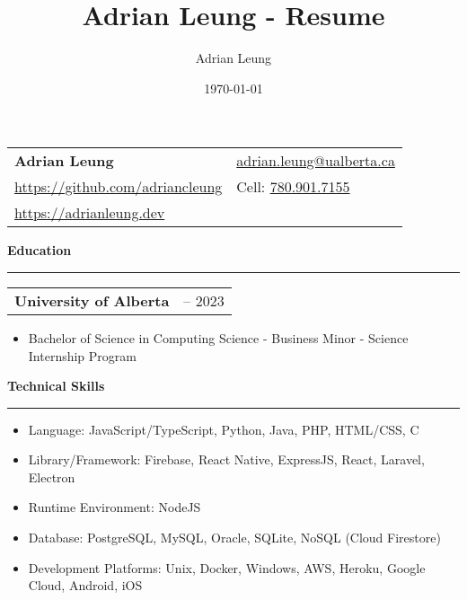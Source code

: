 \documentclass[11pt]{article}
\title{Adrian Leung - Resume}
\author{Adrian Leung}
\date{\today}
\newenvironment{compactList}
{
  \begin{itemize}
    \setlength{\itemsep}{0pt}
    \setlength{\parskip}{0pt}
}
{\end{itemize}}
\begin{document}
\begin{tabularx}{\textwidth}
  {
    >{\raggedright\arraybackslash}X
    >{\raggedleft\arraybackslash}X
  }
  \Large\textbf{Adrian Leung}                                             & \href{mailto:adrian.leung@ualberta.ca}{adrian.leung@ualberta.ca} \\
  \href{https://github.com/adriancleung}{https://github.com/adriancleung} & Cell: \href{tel:780.901.7155}{780.901.7155}                      \\
  \href{https://adrianleung.dev}{https://adrianleung.dev}                 &                                                                  \\
\end{tabularx}
\vspace{-15pt}

\begin{center}
  \textbf{Education}
  \noindent\rule[10pt]{0.9\paperwidth}{0.4pt}
\end{center}
\vspace{-20pt}
\begin{tabularx}{\textwidth}
  {
    >{\raggedright\arraybackslash}X
    >{\raggedleft\arraybackslash}X
  }
  \textbf{University of Alberta} & 2017 – 2023 \\
\end{tabularx}
\vspace{-20pt}
\begin{itemize}
  \item Bachelor of Science in Computing Science - Business Minor - Science Internship Program
\end{itemize}
\vspace{-15pt}

\begin{center}
  \textbf{Technical Skills}
  \noindent\rule[10pt]{0.9\paperwidth}{0.4pt}
\end{center}
\vspace{-30pt}
\begin{compactList}
  \item Language: JavaScript/TypeScript, Python, Java, PHP, HTML/CSS, C
  \item Library/Framework: Firebase, React Native, ExpressJS, React, Laravel, Electron
  \item Runtime Environment: NodeJS
  \item Database: PostgreSQL, MySQL, Oracle, SQLite, NoSQL (Cloud Firestore)
  \item Development Platforms: Unix, Docker, Windows, AWS, Heroku, Google Cloud, Android, iOS
\end{compactList}
\vspace{-15pt}
\end{document}
